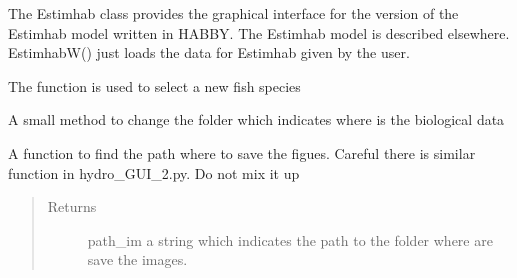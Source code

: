 \documentclass[letterpaper,10pt,english]{sphinxmanual}
\begin{document}
\begin{fulllineitems}
\label{\detokenize{index:src_GUI.estimhab_GUI.EstimhabW}}
The Estimhab class provides the graphical interface for the version of the Estimhab model written in HABBY.
The Estimhab model is described elsewhere. EstimhabW() just loads the data for Estimhab given by the user.

\begin{fulllineitems}
\label{\detokenize{index:src_GUI.estimhab_GUI.EstimhabW.add_fish}}
The function is used to select a new fish species

\end{fulllineitems}


\begin{fulllineitems}
\label{\detokenize{index:src_GUI.estimhab_GUI.EstimhabW.change_folder}}
A small method to change the folder which indicates where is the biological data

\end{fulllineitems}


\begin{fulllineitems}
\label{\detokenize{index:src_GUI.estimhab_GUI.EstimhabW.find_path_im_est}}
A function to find the path where to save the figues. Careful there is similar function in hydro\_GUI\_2.py.
Do not mix it up
\begin{quote}\begin{description}
\item[{Returns}] \leavevmode
path\_im a string which indicates the path to the folder where are save the images.

\end{description}\end{quote}

\end{fulllineitems}



\end{fulllineitems}
\end{document}
